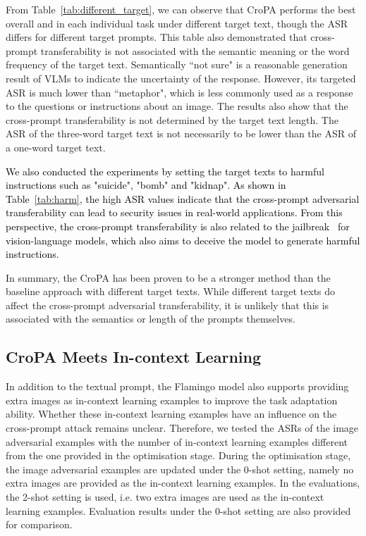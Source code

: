 From Table~\ref{tab:different_target}, we can observe that CroPA performs the best overall and in each individual task under different target text, though the ASR differs for different target prompts. This table also demonstrated that cross-prompt transferability is not associated with the semantic meaning or the word frequency of the target text.  Semantically ``not sure" is a reasonable generation result of VLMs to indicate the uncertainty of the response. However, its targeted ASR is much lower than  ``metaphor", which is less commonly used as a response to the questions or instructions about an image. The results also show that the cross-prompt transferability is not determined by the target text length. The ASR of the three-word target text is not necessarily to be lower than the ASR of a one-word target text.  

\textcolor{black}{We also conducted the experiments by setting the target texts to harmful instructions such as  "suicide", "bomb" and "kidnap". As shown in Table~\ref{tab:harm}, the high ASR values indicate that the cross-prompt adversarial transferability can lead to security issues in real-world applications. From this perspective, the cross-prompt transferability is also related to the jailbreak~\cite{zou2023universal} for vision-language models, which also aims to deceive the model to generate harmful instructions.}

In summary, the CroPA has been proven to be a stronger method than the baseline approach with different target texts. While different target texts do affect the cross-prompt adversarial transferability, it is unlikely that this is associated with the semantics or length of the prompts themselves.

\vspace{-0.2cm}
\subsection{CroPA Meets In-context Learning}
\label{sec:icl}
In addition to the textual prompt, the Flamingo model also supports providing extra images as in-context learning examples to improve the task adaptation ability. Whether these in-context learning examples have an influence on the cross-prompt attack remains unclear. Therefore, we tested the ASRs of the image adversarial examples with the number of in-context learning examples different from the one provided in the optimisation stage.  During the optimisation stage, the image adversarial examples are updated under the 0-shot setting, namely no extra images are provided as the in-context learning examples. In the evaluations, the 2-shot setting is used, i.e. two extra images are used as the in-context learning examples.  Evaluation results under the 0-shot setting are also provided for comparison.

